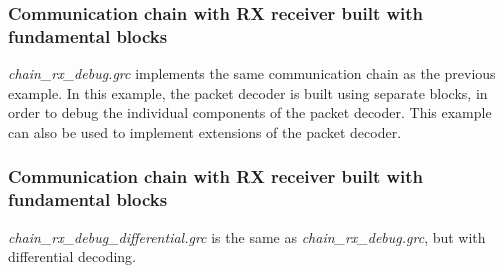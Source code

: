 \subsubsection*{Communication chain with RX receiver built with fundamental blocks}
\textit{chain\_rx\_debug.grc} implements the same communication chain as the previous example. In this example, the packet decoder is built using separate blocks, in order to debug the individual components of the packet decoder. This example can also be used to implement extensions of the packet decoder.

\subsubsection*{Communication chain with RX receiver built with fundamental blocks}
\textit{chain\_rx\_debug\_differential.grc} is the same as \textit{chain\_rx\_debug.grc}, but with differential decoding.

